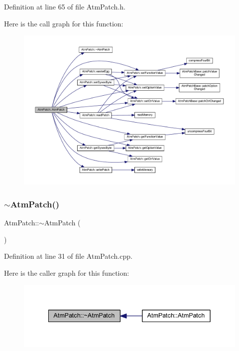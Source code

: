 Definition at line 65 of file Atm\+Patch.\+h.

Here is the call graph for this function\+:
\nopagebreak
\begin{figure}[H]
\begin{center}
\leavevmode
\includegraphics[width=350pt]{d9/de1/class_atm_patch_ac9d24dbe3f01ee12145649819017f697_cgraph}
\end{center}
\end{figure}
\mbox{\label{class_atm_patch_ae37c93d358677907afbcc74c34469ba2}} 
\subsubsection{\texorpdfstring{$\sim$\+Atm\+Patch()}{~AtmPatch()}}
{\footnotesize\ttfamily Atm\+Patch\+::$\sim$\+Atm\+Patch (\begin{DoxyParamCaption}{ }\end{DoxyParamCaption})}



Definition at line 31 of file Atm\+Patch.\+cpp.

Here is the caller graph for this function\+:
\nopagebreak
\begin{figure}[H]
\begin{center}
\leavevmode
\includegraphics[width=342pt]{d9/de1/class_atm_patch_ae37c93d358677907afbcc74c34469ba2_icgraph}
\end{center}
\end{figure}


